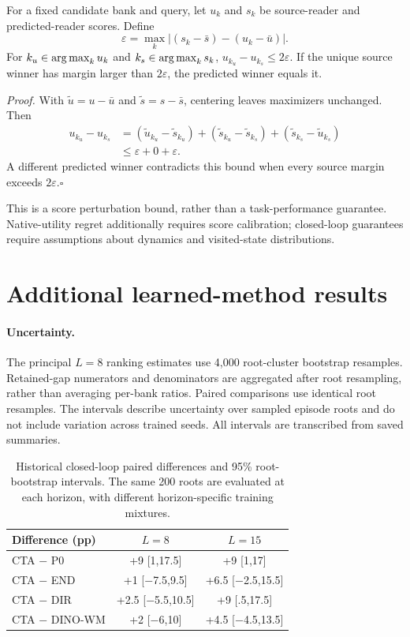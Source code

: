 \documentclass[10pt,twocolumn,letterpaper]{article}
\begin{document}
\begin{proposition}
For a fixed candidate bank and query, let $u_k$ and $s_k$ be source-reader and predicted-reader scores. Define
\[
\varepsilon=\max_k|(s_k-\bar s)-(u_k-\bar u)|.
\]
For $k_u\in\operatorname*{arg\,max}_k u_k$ and $k_s\in\operatorname*{arg\,max}_k s_k$, $u_{k_u}-u_{k_s}\le2\varepsilon$. If the unique source winner has margin larger than $2\varepsilon$, the predicted winner equals it.
\end{proposition}
\noindent\textit{Proof.} With $\tilde u=u-\bar u$ and $\tilde s=s-\bar s$, centering leaves maximizers unchanged. Then
\begin{align*}
u_{k_u}-u_{k_s}
&=(\tilde u_{k_u}-\tilde s_{k_u})
 +(\tilde s_{k_u}-\tilde s_{k_s})
 +(\tilde s_{k_s}-\tilde u_{k_s})\\
&\le\varepsilon+0+\varepsilon.
\end{align*}
A different predicted winner contradicts this bound when every source margin exceeds $2\varepsilon$.\hfill$\square$

This is a score perturbation bound, rather than a task-performance guarantee. Native-utility regret additionally requires score calibration; closed-loop guarantees require assumptions about dynamics and visited-state distributions.

\section{Additional learned-method results}
\paragraph{Uncertainty.}
The principal $L=8$ ranking estimates use 4,000 root-cluster bootstrap resamples. Retained-gap numerators and denominators are aggregated after root resampling, rather than averaging per-bank ratios. Paired comparisons use identical root resamples. The intervals describe uncertainty over sampled episode roots and do not include variation across trained seeds. All intervals are transcribed from saved summaries.

\begin{table}[t]
\centering\small
\setlength{\tabcolsep}{3pt}
\begin{tabular}{lcc}
\toprule
Difference (pp) & $L=8$ & $L=15$ \\
\midrule
CTA $-$ P0 & +9 [1,17.5] & +9 [1,17] \\
CTA $-$ END & +1 [$-$7.5,9.5] & +6.5 [$-$2.5,15.5] \\
CTA $-$ DIR & +2.5 [$-$5.5,10.5] & +9 [.5,17.5] \\
CTA $-$ DINO-WM & +2 [$-$6,10] & +4.5 [$-$4.5,13.5] \\
\bottomrule
\end{tabular}
\caption{Historical closed-loop paired differences and 95\% root-bootstrap intervals. The same 200 roots are evaluated at each horizon, with different horizon-specific training mixtures.}
\end{table}
\end{document}
